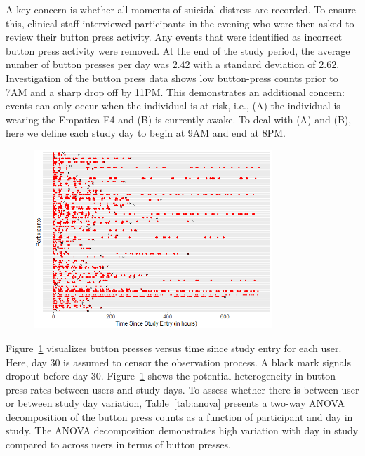 \documentclass[12pt]{amsart}
\begin{document}
A key concern is whether all moments of suicidal distress are recorded.  To ensure this, clinical staff interviewed participants in the evening who were then asked to review their button press activity.  Any events that were identified as incorrect button press activity were removed.  At the end of the study period, the average number of button presses per day was $2.42$ with a standard deviation of $2.62$.  Investigation of the button press data shows low button-press counts prior to 7AM and a sharp drop off by 11PM. This demonstrates an additional concern: events can only occur when the individual is at-risk, i.e., (A) the individual is wearing the Empatica E4 and (B) is currently awake. To deal with (A) and (B), here we define each study day to begin at 9AM and end at 8PM.

\vspace{0.25cm}
\begin{figure}[!th]
    \centering
    \includegraphics[width=0.8\textwidth]{../figures/recurrentevents_plot.png}
    \label{fig:buttons}
\end{figure}
\vspace{0.25cm}

Figure~\ref{fig:buttons} visualizes button presses versus time since study entry for each user. Here, day 30 is assumed to censor the observation process. A black mark signals dropout before day 30.   Figure~\ref{fig:buttons} shows the potential heterogeneity in button press rates between users and study days. To assess whether there is between user or between study day variation, Table~\ref{tab:anova} presents a two-way ANOVA decomposition of the button press counts as a function of participant and day in study.  The ANOVA decomposition demonstrates high variation with day in study compared to across users in terms of button presses.
\end{document}

